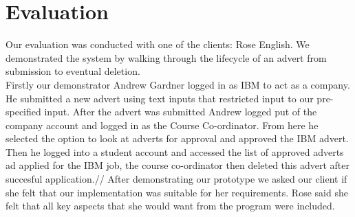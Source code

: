 \documentclass{l3deliverable}
\begin{document}
\section{Evaluation}

Our evaluation was conducted with one of the clients: Rose English. We demonstrated the system by walking through the lifecycle of an advert from submission to eventual deletion.\\
Firstly our demonstrator Andrew Gardner logged in as IBM to act as a company. He submitted a new advert using text inputs that restricted input to our pre-specified input. After the advert was submitted Andrew logged put of the company account and logged in as the Course Co-ordinator. From here he selected the option to look at adverts for approval and approved the IBM advert. Then he logged into a student account and accessed the list of approved adverts ad applied for the IBM job, the course co-ordinator then deleted this advert after succesful application.//
After demonstrating our prototype we asked our client if she felt that our implementation was suitable for her requirements. Rose said she felt that all key aspects that she would want from the program were included.\\


\end{document}
